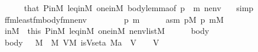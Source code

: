 \begin{isabellebody}
\ \ \ \ \isamarkupfalse%
\ that\ P{\isacharunderscore}{\kern0pt}in{\isacharunderscore}{\kern0pt}M\ leq{\isacharunderscore}{\kern0pt}in{\isacharunderscore}{\kern0pt}M\ one{\isacharunderscore}{\kern0pt}in{\isacharunderscore}{\kern0pt}M\ body{\isacharunderscore}{\kern0pt}lemma{\isacharbrackleft}{\kern0pt}of\ {\isasymrho}p\ {\isasymalpha}\ m\ nenv\ {\isasymphi}{\isacharbrackright}{\kern0pt}\ \isamarkupfalse%
\ simp\isanewline
\ \ \isamarkupfalse%
\ {\isacharquery}{\kern0pt}f{\isacharunderscore}{\kern0pt}fm{\isacharequal}{\kern0pt}{\isachardoublequoteopen}least{\isacharunderscore}{\kern0pt}fm{\isacharparenleft}{\kern0pt}body{\isacharunderscore}{\kern0pt}fm{\isacharparenleft}{\kern0pt}{\isasymphi}{\isacharcomma}{\kern0pt}nenv{\isacharparenright}{\kern0pt}{\isacharcomma}{\kern0pt}{}{\isacharparenright}{\kern0pt}{\isachardoublequoteclose}\isanewline
\ \ \isacommand{{\isacharbraceleft}{\kern0pt}}\isamarkupfalse%
\isanewline
\ \ \ \ \isamarkupfalse%
\ {\isasymrho}p\ m\isanewline
\ \ \ \ \isamarkupfalse%
\ asm{\isacharcolon}{\kern0pt}\ {\isachardoublequoteopen}{\isasymrho}p{\isasymin}M{\isachardoublequoteclose}\ {\isachardoublequoteopen}{\isasymrho}p{\isasymin}{\isacharquery}{\kern0pt}{\isasympi}{\isachardoublequoteclose}\ {\isachardoublequoteopen}m{\isasymin}M{\isachardoublequoteclose}\isanewline
\ \ \ \ \isamarkupfalse%
\ inM\ {\isacharequal}{\kern0pt}\ this\ P{\isacharunderscore}{\kern0pt}in{\isacharunderscore}{\kern0pt}M\ leq{\isacharunderscore}{\kern0pt}in{\isacharunderscore}{\kern0pt}M\ one{\isacharunderscore}{\kern0pt}in{\isacharunderscore}{\kern0pt}M\ {\isacartoucheopen}nenv{\isasymin}list{\isacharparenleft}{\kern0pt}M{\isacharparenright}{\kern0pt}{\isacartoucheclose}\isanewline
\ \ \ \ \isamarkupfalse%
\ body\isanewline
\ \ \ \ \isamarkupfalse%
\ body{\isacharprime}{\kern0pt}{\isacharcolon}{\kern0pt}{\isachardoublequoteopen}{\isasymAnd}{\isasymalpha}{\isachardot}{\kern0pt}\ {\isasymalpha}\ {\isasymin}\ M\ {\isasymLongrightarrow}\ {\isacharparenleft}{\kern0pt}{\isasymexists}{\isasymtau}{\isasymin}M{\isachardot}{\kern0pt}\ {\isasymexists}V{\isasymin}M{\isachardot}{\kern0pt}\ is{\isacharunderscore}{\kern0pt}Vset{\isacharparenleft}{\kern0pt}{\isasymlambda}a{\isachardot}{\kern0pt}\ {\isacharparenleft}{\kern0pt}{\isacharhash}{\kern0pt}{\isacharhash}{\kern0pt}M{\isacharparenright}{\kern0pt}{\isacharparenleft}{\kern0pt}a{\isacharparenright}{\kern0pt}{\isacharcomma}{\kern0pt}\ {\isasymalpha}{\isacharcomma}{\kern0pt}\ V{\isacharparenright}{\kern0pt}\ {\isasymand}\ {\isasymtau}\ {\isasymin}\ V\ {\isasymand}\isanewline

\end{isabellebody}
